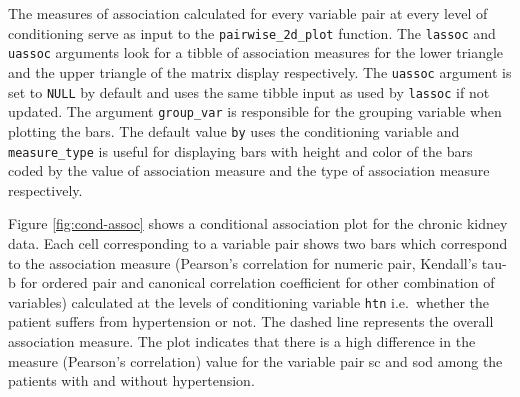 The measures of association calculated for every variable pair at every
level of conditioning serve as input to the \texttt{pairwise\_2d\_plot}
function. The \texttt{lassoc} and \texttt{uassoc} arguments look for a
tibble of association measures for the lower triangle and the upper
triangle of the matrix display respectively. The \texttt{uassoc}
argument is set to \texttt{NULL} by default and uses the same tibble
input as used by \texttt{lassoc} if not updated. The argument
\texttt{group\_var} is responsible for the grouping variable when
plotting the bars. The default value \texttt{by} uses the conditioning
variable and \texttt{measure\_type} is useful for displaying bars with
height and color of the bars coded by the value of association measure
and the type of association measure respectively.

Figure \ref{fig:cond-assoc} shows a conditional association plot for the
chronic kidney data. Each cell corresponding to a variable pair shows
two bars which correspond to the association measure (Pearson's
correlation for numeric pair, Kendall's tau-b for ordered pair and
canonical correlation coefficient for other combination of variables)
calculated at the levels of conditioning variable \texttt{htn}
i.e.~whether the patient suffers from hypertension or not. The dashed
line represents the overall association measure. The plot indicates that
there is a high difference in the measure (Pearson's correlation) value
for the variable pair sc and sod among the patients with and without
hypertension.

